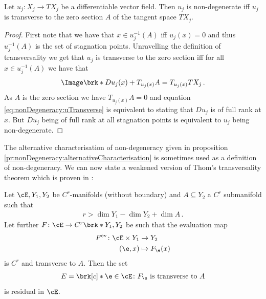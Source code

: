 \begin{proposition}\label{pr:nonDegeneracy:alternativeCharacterisation}
  Let $u_j\colon X_j\to TX_j$ be a differentiable vector field.
  Then $u_j$ is non-degenerate iff $u_j$ is transverse to the zero section $A$ of the tangent space $TX_j$.
\end{proposition}
\begin{proof}
  First note that we have that $x\in u_j^{-1}(A)$ iff $u_j(x)=0$ and thus $u_j^{-1}(A)$ is the set of stagnation points.
  Unravelling the definition of transversality we get that $u_j$ is transverse to the zero section iff for all $x\in u_j^{-1}(A)$
  we have that
  \begin{align}
    \Image\brk*{Du_j(x)}+T_{u_j(x)}A = T_{u_j(x)}TX_j\,. \label{eq:nonDegeneracy:uTransverse}
  \end{align}
  As $A$ is the zero section we have $T_{u_j(x)}A=0$ and equation \eqref{eq:nonDegeneracy:uTransverse}
  is equivalent to stating that $Du_j$ is of full rank at $x$. But $Du_j$ being of full rank at all stagnation points
  is equivalent to $u_j$ being non-degenerate.
\end{proof}
The alternative characterisation of non-degeneracy given in proposition \ref{pr:nonDegeneracy:alternativeCharacterisation}
is sometimes used as a definition of non-degeneracy.
We can now state a weakened version of Thom's transversality theorem which is proven in \cite[§3 Theorem 2.7]{Hirsch1994}:
\begin{theorem}
  Let $\cE,Y_1,Y_2$ be $C^r$-manifolds (without boundary) and $A\subseteq Y_2$ a $C^r$ submanifold such that
  \begin{align*}
    r>\dim Y_1-\dim Y_2+\dim A\,.
  \end{align*}
  Let further $F\colon \cE\to C^r\brk*{Y_1,Y_2}$ be such that the evaluation map
  \begin{align*}
    F^\text{ev}\colon \cE\times Y_1&\to Y_2 \\
    (\e,x)&\mapsto F_\e(x)
  \end{align*}
  is $C^r$ and transverse to $A$.
  Then the set
  \begin{align*}
    E=\brk[c]*{\e\in \cE\colon F_\e\text{ is transverse to } A}
  \end{align*}
  is residual in $\cE$.
\end{theorem}
